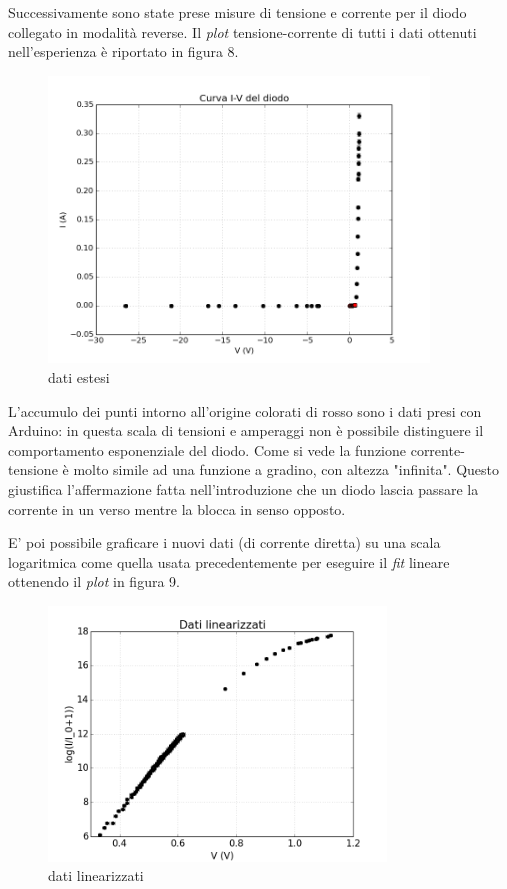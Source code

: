 \documentclass[a4paper,10pt]{article}
\begin{document}
Successivamente sono state prese misure di tensione e corrente per il diodo collegato in modalità reverse. Il \emph{plot} tensione-corrente di tutti i dati ottenuti nell'esperienza è riportato in figura 8.

\begin{figure}[!htb]
\begin{center}
\includegraphics[width=0.9\textwidth]{curvaiv_2.png}
\end{center}
\caption{dati estesi}
\end{figure}

L'accumulo dei punti intorno all'origine colorati di rosso sono i dati presi con Arduino: in questa scala di tensioni e amperaggi non è possibile distinguere il comportamento esponenziale del diodo. Come si vede la funzione corrente-tensione è molto simile ad una funzione a gradino, con altezza "infinita". Questo giustifica l'affermazione fatta nell'introduzione che un diodo lascia passare la corrente in un verso mentre la blocca in senso opposto.

E' poi possibile graficare i nuovi dati (di corrente diretta) su una scala logaritmica come quella usata precedentemente per eseguire il \emph{fit} lineare ottenendo il \emph{plot} in figura 9.
\\
\begin{figure}[!htb]
\begin{center}
\includegraphics[width=0.8\textwidth]{lin1.png}
\end{center}
\caption{dati linearizzati}
\end{figure}
\\
\end{document}
